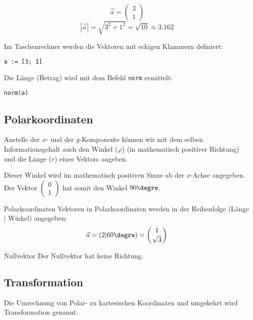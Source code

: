     \begin{beispiel}{}{}
      $$ \vec{a}= \begin{pmatrix} 3\\ 1\end{pmatrix}$$
        $$|\vec{a}| = \sqrt{3^2+1^2} = \sqrt{10}\approx 3.162$$
      \end{beispiel}
    

    \begin{bemerkung}{}{}
      Im Taschenrechner werden die Vektoren mit eckigen Klammern
      definiert:

      \texttt{a := [3; 1]}

      Die Länge (Betrag) wird mit dem Befehl \texttt{norm} ermittelt:

      \texttt{norm(a)}
    \end{bemerkung}

\newpage

\subsection{Polarkoordinaten}


\newpage

Anstelle der $x$- und der $y$-Komponente können wir mit dem selben
Informationsgehalt auch den Winkel ($\varphi$)
(in mathematisch positiver Richtung) und die Länge ($r$) eines Vektors
angeben.


Dieser Winkel wird im mathematisch positiven Sinne ab der $x$-Achse
angegeben. Der Vektor
$\begin{pmatrix}0\\1\end{pmatrix}$ hat somit den Winkel $90\degre$.
  \begin{definition}{Polarkoordinaten}{}
    Vektoren in Polarkoordinaten werden in der Reihenfolge (Länge |
    Winkel) angegeben:
    $$\vec{a} = (2 | 60\degre) = \left(1\atop \sqrt{3}\right)$$
    \end{definition}
  \begin{bemerkung}{Nullvektor}{}
    Der Nullvektor hat keine Richtung.
    \end{bemerkung}
  \newpage
\subsection{Transformation}
  Die Umrechnung von Polar- zu kartesischen
  Koordinaten und umgekehrt wird Transformation genannt.
  
